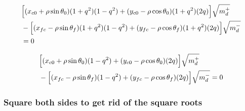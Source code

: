 \documentclass[12pt]{article}
\begin{document}
\begin{align*}
    &\Bigl[(x_{c0} + \rho\sin\theta_0)(1 + q^2)(1-q^2) + (y_{c0} - \rho\cos\theta_0)(1 + q^2)(2q) \Bigr]\sqrt{m_d^+}\\
    &- \Bigl[ (x_{fc} - \rho\sin\theta_f)(1 + q^2)(1-q^2) + (y_{fc} - \rho\cos\theta_f)(1 + q^2)(2q) \Bigr]\sqrt{m_d^-} \\
    & = 0
\end{align*}

\begin{align*}
    &\Bigl[(x_{c0} + \rho\sin\theta_0)(1-q^2) + (y_{c0} - \rho\cos\theta_0)(2q) \Bigr]\sqrt{m_d^+}\\
    &- \Bigl[ (x_{fc} - \rho\sin\theta_f)(1-q^2) + (y_{fc} - \rho\cos\theta_f)(2q) \Bigr]\sqrt{m_d^-} = 0
\end{align*}


\subsubsection*{Square both sides to get rid of the square roots}
\end{document}
